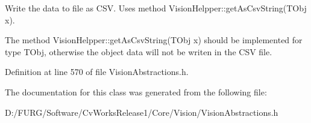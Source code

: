 Write the data to file as C\+S\+V. Uses method Vision\+Helpper\+::get\+As\+Csv\+String(\+T\+Obj x). 

The method Vision\+Helpper\+::get\+As\+Csv\+String(\+T\+Obj x) should be implemented for type T\+Obj, otherwise the object data will not be writen in the C\+S\+V file. 

Definition at line 570 of file Vision\+Abstractions.\+h.



The documentation for this class was generated from the following file\+:\begin{DoxyCompactItemize}
\item 
D\+:/\+F\+U\+R\+G/\+Software/\+Cv\+Works\+Release1/\+Core/\+Vision/Vision\+Abstractions.\+h\end{DoxyCompactItemize}
